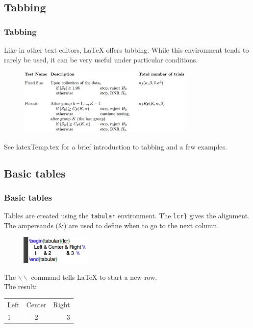 \documentclass[slidestop,compress,mathserif]{beamer}
\begin{document}
\subsection[Tabbing]{Tabbing}
\begin{frame} \frametitle{Tabbing}
	Like in other text editors, LaTeX offers tabbing. While this environment tends to rarely be used, it can be very useful under particular conditions.
	\begin{figure}[htbp]
		\centering
		\includegraphics[height=1.3in]{basicsOfLatex/tabTable/tabbingExample}
	\end{figure}
	See {\color{highlight}latexTemp.tex} for a brief introduction to tabbing and a few examples.
\end{frame}

\subsection[Basic tables]{Basic tables}
\begin{frame} \frametitle{Basic tables}
	Tables are created using the \texttt{\color{highlight}tabular} environment. The \text{\color{braces}\{}\texttt{lcr}\texttt{\color{braces}\}} gives the alignment. The ampersands ({\color{highlight}\&}) are used to define when to go to the next column.
	\begin{figure}[htbp]
		\centering
		\includegraphics[height=0.55in]{basicsOfLatex/tabTable/basicTable}
	\end{figure}
	The \texttt{\color{command}$\backslash\backslash$} command tells LaTeX to start a new row.  \\
	\vspace{0.3cm}
	The result: \\
	\vspace{0.3cm}
	\begin{tabular}{lcr} %
		Left & Center & Right \\ %
		1     & 2           & 3  \\
	\end{tabular}
\end{frame}
\end{document}
